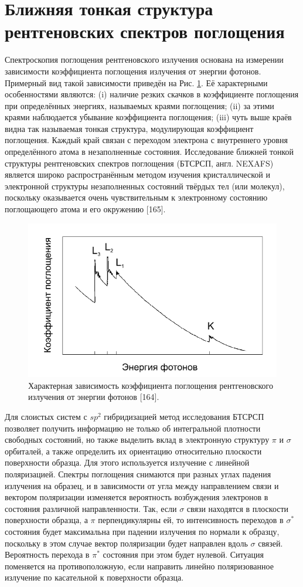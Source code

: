 \section{ Ближняя тонкая структура рентгеновских спектров поглощения}
Спектроскопия поглощения рентгеновского излучения основана на измерении зависимости коэффициента поглощения излучения от энергии фотонов. Примерный вид такой зависимости приведён на Рис. \ref{img:nexafs}. Её характерными особенностями являются: (i) наличие резких скачков в коэффициенте поглощения при определённых энергиях, называемых краями поглощения; (ii) за этими краями наблюдается убывание коэффициента поглощения; (iii) чуть выше краёв видна так называемая тонкая структура, модулирующая коэффициент поглощения. Каждый край связан с переходом электрона с внутреннего уровня определённого атома в незаполненные состояния. Исследование ближней тонкой структуры рентгеновских спектров поглощения (БТСРСП, англ. NEXAFS) является широко распространённым методом изучения кристаллической и электронной структуры незаполненных состояний твёрдых тел (или молекул), поскольку оказывается очень чувствительным к электронному состоянию поглощающего атома и его окружению [165].
 \begin{figure}[ht] 
  \center
  \includegraphics [scale=0.47] {./Dissertation/images/nexafs.png}
  \caption{Характерная зависимость коэффициента поглощения рентгеновского излучения от
энергии фотонов [164].} 
  \label{img:nexafs}  
\end{figure}
Для слоистых систем с $sp^2$ гибридизацией метод исследования БТСРСП позволяет получить информацию не только об интегральной плотности свободных состояний, но также выделить вклад в электронную структуру $\pi$ и $\sigma$ орбиталей, а также определить их ориентацию относительно плоскости поверхности образца. Для этого используется излучение с линейной поляризацией. Спектры поглощения снимаются при разных углах падения излучения на образец, и в зависимости от угла между направлением связи и вектором поляризации изменяется вероятность возбуждения электронов в состояния различной направленности. Так, если $\sigma$ связи находятся в плоскости поверхности образца, а $\pi$ перпендикулярны ей, то интенсивность переходов в $\sigma^*$ состояния будет максимальна при падении излучения по нормали к образцу, поскольку в этом случае вектор поляризации будет направлен вдоль $\sigma$ связей. Вероятность перехода в $\pi^*$ состояния при этом будет нулевой. Ситуация поменяется на противоположную, если направить линейно поляризованное излучение по касательной к поверхности образца.
